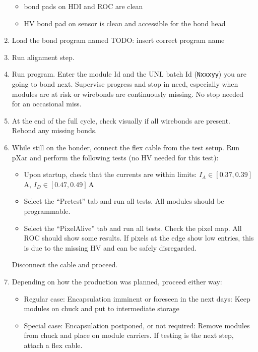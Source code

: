 \documentclass[12pt]{unlsilabsop}
\begin{document}
\begin{enumerate}
\begin{itemize}
        \item bond pads on HDI and ROC are clean
        \item HV bond pad on sensor is clean and accessible for the bond head
    \end{itemize}
    \item Load the bond program named TODO: insert correct program name
    \item Run alignment step.
    \item Run program. Enter the module Id and the UNL batch Id (\texttt{Nxxxyy}) you are going to bond next. Supervise progress and stop in need, especially when modules are at risk or wirebonds are continuously missing. No stop needed for an occasional miss.
    \item At the end of the full cycle, check visually if all wirebonds are present. Rebond any missing bonds.
    \item While still on the bonder, connect the flex cable from the test setup. Run pXar and perform the following tests (no HV needed for this test):
    \begin{itemize}
        \item Upon startup, check that the currents are within limits: $I_A\in[0.37,0.39]\,$A, $I_D\in[0.47,0.49]\,$A
        \item Select the ``Pretest'' tab and run all tests. All modules should be programmable.
        \item Select the ``PixelAlive'' tab and run all tests. Check the pixel map. All ROC should show some results. If pixels at the edge show low entries, this is due to the missing HV and can be safely disregarded.
    \end{itemize}
    Disconnect the cable and proceed.
    \item Depending on how the production was planned, proceed either way:
    \begin{itemize}
        \item Regular case: Encapsulation imminent or foreseen in the next days: Keep modules on chuck and put to intermediate storage
        \item Special case: Encapsulation postponed, or not required: Remove modules from chuck and place on module carriers. If testing is the next step, attach a flex cable.
    \end{itemize}
\end{enumerate}
\end{document}
